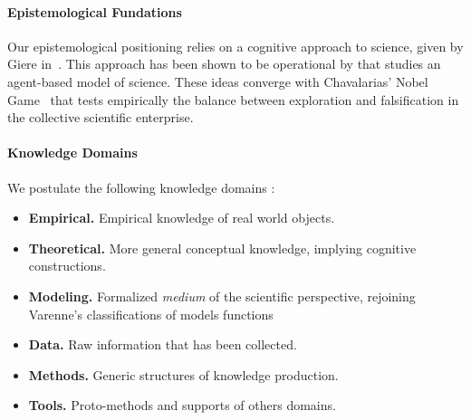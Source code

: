\documentclass[runningheads,a4paper]{llncs2e/llncs}
\begin{document}

\paragraph{Epistemological Fundations}

Our epistemological positioning relies on a cognitive approach to science, given by Giere in~\cite{giere2010explaining}. 
This approach has been shown to be operational by \cite{giere2010agent} that studies an agent-based model of science. These ideas converge with Chavalarias' Nobel Game~\cite{} %
that tests empirically the balance between exploration and falsification in the collective scientific enterprise.


\paragraph{Knowledge Domains}

We postulate the following knowledge domains :
\begin{itemize}
\item \textbf{Empirical.} Empirical knowledge of real world objects.
\item \textbf{Theoretical.} More general conceptual knowledge, implying cognitive constructions.
\item \textbf{Modeling.} Formalized \emph{medium} of the scientific perspective, rejoining Varenne's classifications of models functions~\cite{varenne2010simulations}
\item \textbf{Data.} Raw information that has been collected.
\item \textbf{Methods.} Generic structures of knowledge production.
\item \textbf{Tools.} Proto-methods and supports of others domains.
\end{itemize}
\end{document}
